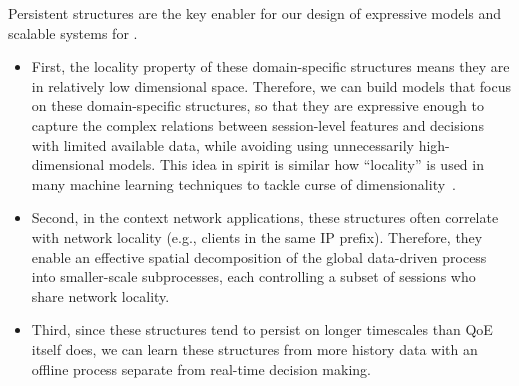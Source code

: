 


Persistent structures are the key
enabler for our design of expressive models and scalable
systems for \ddn.
\begin{itemize}

\item First, the locality property of these domain-specific structures 
means they are in relatively low dimensional space.
Therefore, we can build models that focus on these 
domain-specific structures, so that 
they are expressive enough to capture the complex relations 
between session-level features
and decisions with limited available data, 
while avoiding using unnecessarily high-dimensional models.
This idea in spirit is similar how ``locality''
is used in many machine learning techniques 
to tackle curse of dimensionality~\cite{ml101}.

\item Second, in the context network applications,
these structures often correlate with network locality (e.g., clients 
in the same IP prefix). Therefore, they enable an effective spatial 
decomposition of the global 
data-driven process into smaller-scale 
subprocesses, each controlling a subset of 
sessions who share network locality.

\item Third, since these structures tend to
persist on longer timescales than QoE itself 
does, we can learn these structures from
more history data 
with an
offline process separate from real-time 
decision making.

\end{itemize}


